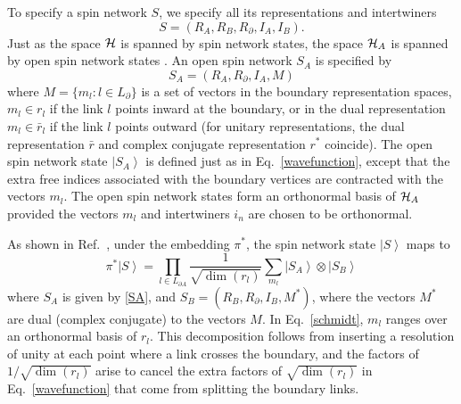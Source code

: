 \documentclass[aps,prd,twocolumn,showpacs,groupedaddress,nofootinbib,letterpaper]{revtex4}
\newcommand{\ket}[1]{\left\vert#1\right\rangle}
\begin{document}
To specify a spin network $S$, we specify all its representations and intertwiners
\begin{equation} \label{S}
S = (R_A, R_B, R_{\partial}, I_A, I_B).
\end{equation}
Just as the space $\cal H$ is spanned by spin network states, the space ${\cal H}_A$ is spanned by open spin network states \cite{Ashtekar1996}.
An open spin network $S_A$ is specified by
\begin{equation} \label{SA}
S_A = (R_A, R_{\partial}, I_A, M)
\end{equation}
where $M = \{m_l : l \in L_{\partial}\}$ is a set of vectors in the boundary representation spaces, $m_l \in r_l$ if the link $l$ points inward at the boundary, or in the dual representation $m_l \in \bar{r}_l$ if the link $l$ points outward (for unitary representations, the dual representation $\bar{r}$ and complex conjugate representation $r^*$ coincide).
The open spin network state $\ket{S_A}$ is defined just as in Eq.~\eqref{wavefunction}, except that the extra free indices associated with the boundary vertices are contracted with the vectors $m_l$.
The open spin network states form an orthonormal basis of ${\cal H}_A$ provided the vectors $m_l$ and intertwiners $i_n$ are chosen to be orthonormal.

As shown in Ref.~\cite{Donnelly2008}, under the embedding $\pi^*$, the spin network state $\ket{S}$ maps to
\begin{equation} \label{schmidt}
\pi^* \ket{S} =
\prod_{l \in L_{\partial A}} \frac{1}{\sqrt{\dim(r_l)}} \sum_{m_l}
\ket{S_A} \otimes \ket{S_B}
\end{equation}
where $S_A$ is given by \eqref{SA}, and $S_B = (R_B, R_{\partial}, I_B, M^*)$, where the vectors $M^*$ are dual (complex conjugate) to the vectors $M$.
In Eq.~\eqref{schmidt}, $m_l$ ranges over an orthonormal basis of $r_l$.
This decomposition follows from inserting a resolution of unity at each point where a link crosses the boundary, and the factors of $1/\sqrt{\dim(r_l)}$ arise to cancel the extra factors of $\sqrt{\dim(r_l)}$ in Eq.~\eqref{wavefunction} that come from splitting the boundary links.
\end{document}
